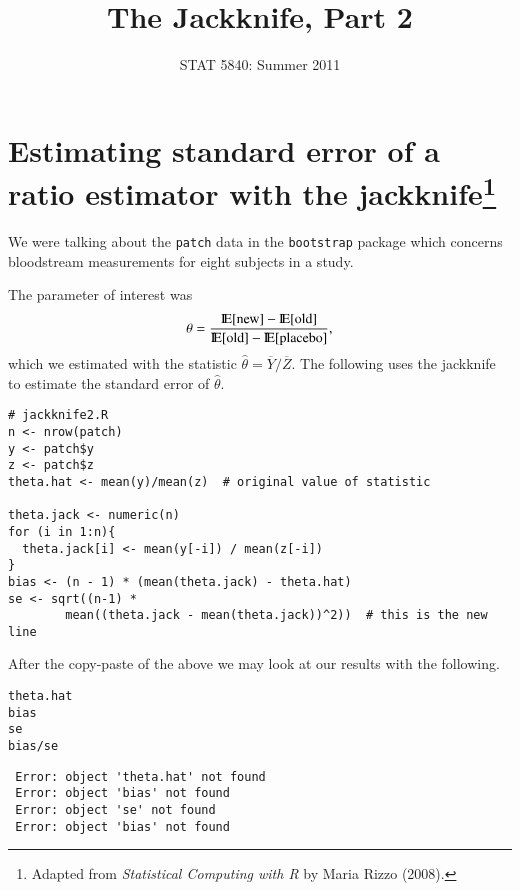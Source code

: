 \documentclass[11pt,english]{article}
\title{The Jackknife, Part 2}
\date{STAT 5840: Summer 2011}
\begin{document}
\maketitle

\thispagestyle{empty}

\section*{Estimating standard error of a ratio estimator with the jackknife\footnote{Adapted from \emph{Statistical Computing with R} by Maria Rizzo (2008). }}
\label{sec-1}

We were talking about the \texttt{patch} data in the \texttt{bootstrap} package which concerns bloodstream measurements for eight subjects in a study. 



The parameter of interest was
\[
\theta = \frac{\mathrm{I\hspace{-1.5pt}E}[\mathrm{new}] - \mathrm{I\hspace{-1.5pt}E}[\mathrm{old}]}{\mathrm{I\hspace{-1.5pt}E}[\mathrm{old}] - \mathrm{I\hspace{-1.5pt}E}[\mathrm{placebo}]},
\]
which we estimated with the statistic \(\hat{\theta} = \overline{Y}/\overline{Z}\).  The following uses the jackknife to estimate the standard error of $\hat{\theta}$.


\begin{verbatim}
# jackknife2.R
n <- nrow(patch)
y <- patch$y
z <- patch$z
theta.hat <- mean(y)/mean(z)  # original value of statistic

theta.jack <- numeric(n)
for (i in 1:n){
  theta.jack[i] <- mean(y[-i]) / mean(z[-i])
}
bias <- (n - 1) * (mean(theta.jack) - theta.hat)
se <- sqrt((n-1) *
        mean((theta.jack - mean(theta.jack))^2))  # this is the new line
\end{verbatim}




After the copy-paste of the above we may look at our results with the following.

\begin{verbatim}
theta.hat
bias
se
bias/se
\end{verbatim}




\begin{verbatim}
 Error: object 'theta.hat' not found
 Error: object 'bias' not found
 Error: object 'se' not found
 Error: object 'bias' not found
\end{verbatim}
\end{document}
